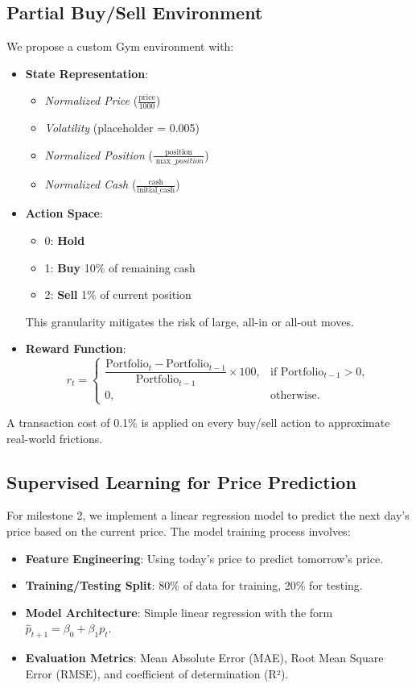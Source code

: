 \documentclass[11pt]{article}
\begin{document}
\subsection{Partial Buy/Sell Environment}
We propose a custom Gym environment with:
\begin{itemize}
  \item \textbf{State Representation}: 
  \begin{itemize}
    \item \textit{Normalized Price} (\(\frac{\text{price}}{1000}\))
    \item \textit{Volatility} (placeholder = 0.005)
    \item \textit{Normalized Position} (\(\frac{\text{position}}{\max\_position}\))
    \item \textit{Normalized Cash} (\(\frac{\text{cash}}{\text{initial\_cash}}\))
  \end{itemize}
  \item \textbf{Action Space}: 
  \begin{itemize}
    \item 0: \textbf{Hold}
    \item 1: \textbf{Buy} 10\% of remaining cash
    \item 2: \textbf{Sell} 1\% of current position
  \end{itemize}
  This granularity mitigates the risk of large, all-in or all-out moves.
  \item \textbf{Reward Function}: 
  \[
    r_t = \begin{cases}
      \dfrac{\text{Portfolio}_t - \text{Portfolio}_{t-1}}{\text{Portfolio}_{t-1}} \times 100, & \text{if } \text{Portfolio}_{t-1} > 0,\\[10pt]
      0, & \text{otherwise}.
    \end{cases}
  \]
\end{itemize}
A transaction cost of 0.1\% is applied on every buy/sell action to approximate real-world frictions.

\subsection{Supervised Learning for Price Prediction}
For milestone 2, we implement a linear regression model to predict the next day's price based on the current price. The model training process involves:
\begin{itemize}
  \item \textbf{Feature Engineering}: Using today's price to predict tomorrow's price.
  \item \textbf{Training/Testing Split}: 80\% of data for training, 20\% for testing.
  \item \textbf{Model Architecture}: Simple linear regression with the form \(\hat{p}_{t+1} = \beta_0 + \beta_1 p_t\).
  \item \textbf{Evaluation Metrics}: Mean Absolute Error (MAE), Root Mean Square Error (RMSE), and coefficient of determination (R²).
\end{itemize}
\end{document}
